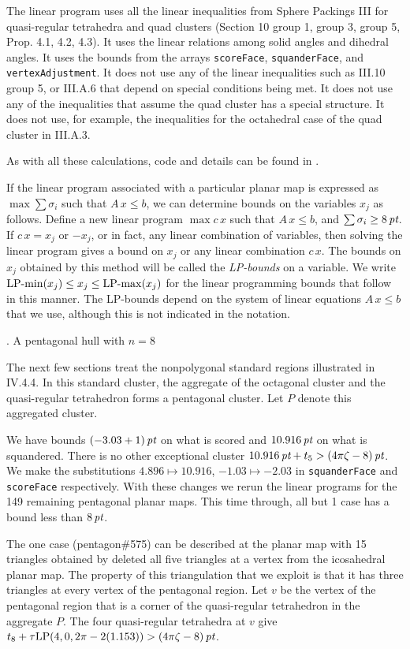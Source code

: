 The linear program uses all the linear inequalities from 
Sphere Packings III for
quasi-regular tetrahedra and quad clusters (Section 10 group 1, group 3,
group 5, Prop. 4.1, 4.2, 4.3).  It uses the linear relations
among solid angles and dihedral angles.  It uses the bounds
from 
the arrays {\tt scoreFace}, {\tt squanderFace}, and {\tt vertexAdjustment}.
It does not use any of the linear inequalities such as
III.10 group 5, or III.A.6 
that depend on special conditions being met.  It does not
use any of the inequalities that assume the quad cluster has a special
structure.  It does not use, for example, the inequalities for
the octahedral case of the quad cluster in III.A.3.

As with all these calculations, code and details can be found in \cite{H1}.

If the linear program associated with a particular planar map
is expressed as $\max \sum\sigma_i$
such that $A\,x\le b$, we can determine bounds on the variables
$x_j$ as follows.   Define a new linear program $\max c\,x$
such that $A\,x\le b$, and $\sum\sigma_i\ge 8\,\hbox{\it pt}$.   If
$c\,x = x_j$ or $-x_j$, or in fact, any linear combination of
variables, then solving the linear program gives a bound on $x_j$
or any linear combination $c\,x$.  The bounds on $x_j$ obtained
by this method will be called the {\it LP-bounds} on a variable.  
We write $\operatorname{LP-min}(x_j)\le x_j\le\operatorname{LP-max}(x_j)$ for the linear programming
bounds that follow in this manner.  The LP-bounds depend on the
system of linear equations $A\,x\le b$ that we use, although this
is not indicated in the notation.

. A pentagonal hull with $n=8$
\endsubhead

The next few sections treat the nonpolygonal standard regions illustrated
in IV.4.4.
In this standard cluster, the aggregate of the octagonal cluster and
the quasi-regular tetrahedron forms a pentagonal cluster.  Let $P$
denote this aggregated cluster.

We have bounds $(-3.03+1)\,\hbox{\it pt}$ on what is scored and $10.916\,\hbox{\it pt}$ on
what is squandered.  There is no other exceptional cluster 
$10.916\,\hbox{\it pt}+t_5>(4\pi\zeta-8)\,\hbox{\it pt}$.  We make the substitutions
$4.896\mapsto 10.916$, $-1.03\mapsto -2.03$ in {\tt squanderFace}
and {\tt scoreFace} respectively.  With these changes we rerun
the linear programs for the 149 remaining pentagonal planar maps.
This time through, all but 1 case has a bound less than $8\,\hbox{\it pt}$.

The one case (pentagon\#575) can be described at the planar map
with 15 triangles obtained by deleted all five triangles at a vertex
from the icosahedral planar map.  The property of this triangulation
that we exploit is that it has three triangles at every vertex of
the pentagonal region. Let $v$ be the vertex of the pentagonal region
that is a corner of the quasi-regular tetrahedron in the aggregate $P$.
The four quasi-regular tetrahedra at $v$ give
$t_8+\operatorname{\hbox{$\tau$}LP}(4,0,2\pi-2(1.153)) > (4\pi\zeta-8)\,\hbox{\it pt}$.  

